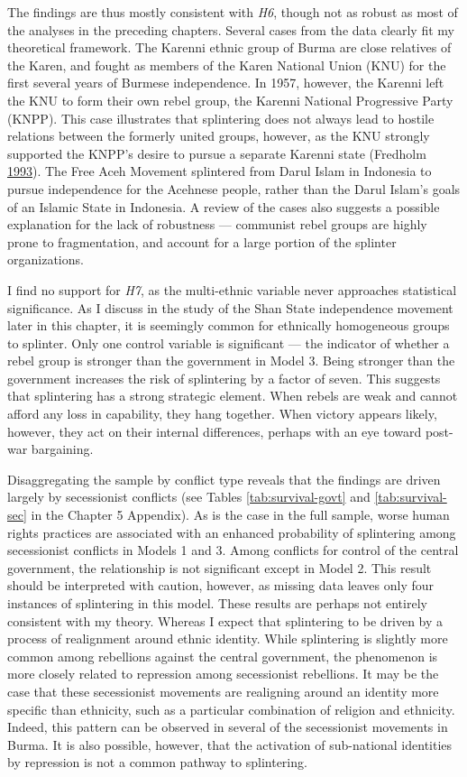 \documentclass[12pt,]{book}
\theoremstyle{definition}
\theoremstyle{definition}
\theoremstyle{definition}
\theoremstyle{remark}
\begin{document}
The findings are thus mostly consistent with \emph{H6}, though not as
robust as most of the analyses in the preceding chapters. Several cases
from the data clearly fit my theoretical framework. The Karenni ethnic
group of Burma are close relatives of the Karen, and fought as members
of the Karen National Union (KNU) for the first several years of Burmese
independence. In 1957, however, the Karenni left the KNU to form their
own rebel group, the Karenni National Progressive Party (KNPP). This
case illustrates that splintering does not always lead to hostile
relations between the formerly united groups, however, as the KNU
strongly supported the KNPP's desire to pursue a separate Karenni state
(Fredholm \protect\hyperlink{ref-Fredholm1993}{1993}). The Free Aceh
Movement splintered from Darul Islam in Indonesia to pursue independence
for the Acehnese people, rather than the Darul Islam's goals of an
Islamic State in Indonesia. A review of the cases also suggests a
possible explanation for the lack of robustness --- communist rebel
groups are highly prone to fragmentation, and account for a large
portion of the splinter organizations.

I find no support for \emph{H7}, as the multi-ethnic variable never
approaches statistical significance. As I discuss in the study of the
Shan State independence movement later in this chapter, it is seemingly
common for ethnically homogeneous groups to splinter. Only one control
variable is significant --- the indicator of whether a rebel group is
stronger than the government in Model 3. Being stronger than the
government increases the risk of splintering by a factor of seven. This
suggests that splintering has a strong strategic element. When rebels
are weak and cannot afford any loss in capability, they hang together.
When victory appears likely, however, they act on their internal
differences, perhaps with an eye toward post-war bargaining.

Disaggregating the sample by conflict type reveals that the findings are
driven largely by secessionist conflicts (see Tables
\ref{tab:survival-govt} and \ref{tab:survival-sec} in the Chapter 5
Appendix). As is the case in the full sample, worse human rights
practices are associated with an enhanced probability of splintering
among secessionist conflicts in Models 1 and 3. Among conflicts for
control of the central government, the relationship is not significant
except in Model 2. This result should be interpreted with caution,
however, as missing data leaves only four instances of splintering in
this model. These results are perhaps not entirely consistent with my
theory. Whereas I expect that splintering to be driven by a process of
realignment around ethnic identity. While splintering is slightly more
common among rebellions against the central government, the phenomenon
is more closely related to repression among secessionist rebellions. It
may be the case that these secessionist movements are realigning around
an identity more specific than ethnicity, such as a particular
combination of religion and ethnicity. Indeed, this pattern can be
observed in several of the secessionist movements in Burma. It is also
possible, however, that the activation of sub-national identities by
repression is not a common pathway to splintering.
\end{document}
